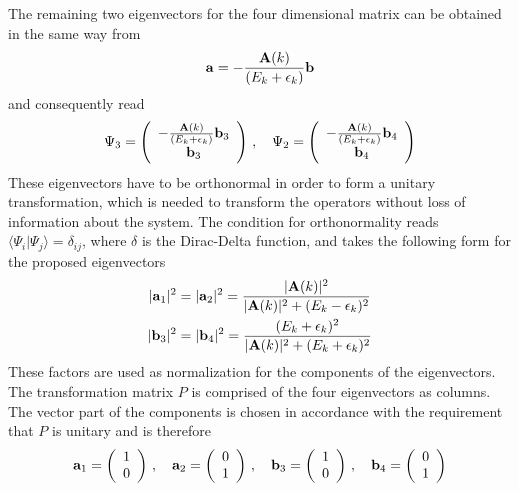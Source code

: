 The remaining two eigenvectors for the four dimensional matrix can be obtained in the same way from 
\begin{align} \nonumber
    \vb{a} = - \frac{\vb{A}(k)}{(E_k + \epsilon_k)} \vb{b}
\end{align}
and consequently read
\begin{align} \nonumber
    \Psi_3 = 
    \left(
    \begin{array}{c}
         - \frac{\vb{A}(k)}{(E_k + \epsilon_k)} \vb{b}_3\\
         \vb{b}_3
    \end{array}
    \right) \, ,
    \quad
    \Psi_2 =
    \left(
    \begin{array}{c}
         - \frac{\vb{A}(k)}{(E_k + \epsilon_k)} \vb{b}_4\\
        \vb{b}_4
    \end{array}
    \right)
\end{align}
These eigenvectors have to be orthonormal in order to form a unitary transformation, which is needed to transform the operators without loss of information about the system.
The condition for orthonormality reads $\langle \Psi_i | \Psi_j \rangle = \delta_{ij}$, where $\delta$ is the Dirac-Delta function, and takes the following form for the proposed eigenvectors
\begin{align} \nonumber
    |\vb{a}_1|^2 &= |\vb{a}_2|^2 = \frac{|\vb{A}(k)|^2}{|\vb{A}(k)|^2 + (E_k - \epsilon_k)^2} \\ \nonumber
    |\vb{b}_3|^2 &= |\vb{b}_4|^2 = \frac{(E_k + \epsilon_k)^2}{|\vb{A}(k)|^2 + (E_k + \epsilon_k)^2}
\end{align}
These factors are used as normalization for the components of the eigenvectors. \newline
The transformation matrix $P$ is comprised of the four eigenvectors as columns.
The vector part of the components is chosen in accordance with the requirement that $P$ is unitary and is therefore 
\begin{align} \nonumber
    \vb{a}_1 =  \left( \begin{array}{c} 1 \\  0 \end{array} \right)\, , \quad \vb{a}_2 =  \left( \begin{array}{c} 0 \\  1 \end{array} \right) \, , \quad
    \vb{b}_3 =  \left( \begin{array}{c} 1 \\  0 \end{array} \right)\, , \quad \vb{b}_4 =  \left( \begin{array}{c} 0 \\  1 \end{array} \right)
\end{align}
